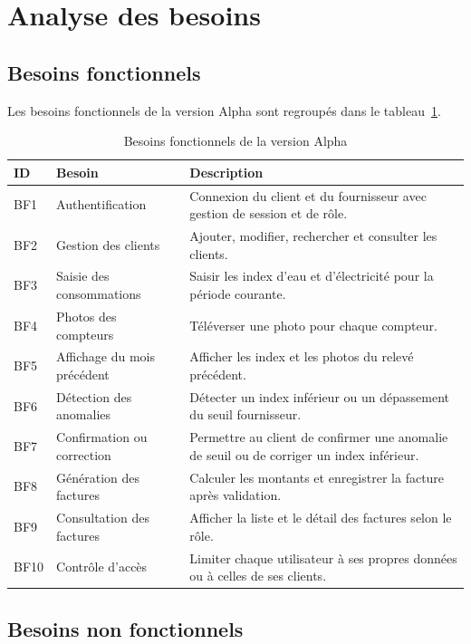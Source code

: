 \section{Analyse des besoins}

\subsection{Besoins fonctionnels}

Les besoins fonctionnels de la version Alpha sont regroupés dans le tableau~\ref{tab:besoins}.

\begin{table}[H]
\centering
\caption{Besoins fonctionnels de la version Alpha}
\label{tab:besoins}
\small
\begin{tabular}{p{}p{}p{}}
\toprule
\textbf{ID} & \textbf{Besoin} & \textbf{Description} \\
\midrule
BF1 & Authentification & Connexion du client et du fournisseur avec gestion de session et de rôle. \\
BF2 & Gestion des clients & Ajouter, modifier, rechercher et consulter les clients. \\
BF3 & Saisie des consommations & Saisir les index d'eau et d'électricité pour la période courante. \\
BF4 & Photos des compteurs & Téléverser une photo pour chaque compteur. \\
BF5 & Affichage du mois précédent & Afficher les index et les photos du relevé précédent. \\
BF6 & Détection des anomalies & Détecter un index inférieur ou un dépassement du seuil fournisseur. \\
BF7 & Confirmation ou correction & Permettre au client de confirmer une anomalie de seuil ou de corriger un index inférieur. \\
BF8 & Génération des factures & Calculer les montants et enregistrer la facture après validation. \\
BF9 & Consultation des factures & Afficher la liste et le détail des factures selon le rôle. \\
BF10 & Contrôle d'accès & Limiter chaque utilisateur à ses propres données ou à celles de ses clients. \\
\bottomrule
\end{tabular}
\end{table}

\subsection{Besoins non fonctionnels}


